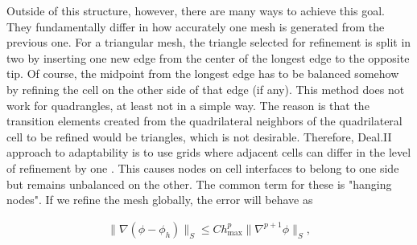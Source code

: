 \documentclass[]{pracamgr}
\begin{document}
        Outside of this structure, however, there are many ways to achieve this goal. They fundamentally differ in how accurately one mesh is generated from the previous one. For a triangular mesh, the triangle selected for refinement is split in two by inserting one new edge from the center of the longest edge to the opposite tip. Of course, the midpoint from the longest edge has to be balanced somehow by refining the cell on the other side of that edge (if any). This method does not work for quadrangles, at least not in a simple way. The reason is that the transition elements created from the quadrilateral neighbors of the quadrilateral cell to be refined would be triangles, which is not desirable. Therefore, Deal.II approach to adaptability is to use grids where adjacent cells can differ in the level of refinement by one \cite{adaptivemeshdealii}. This causes nodes on cell interfaces to belong to one side but remains unbalanced on the other. The common term for these is "hanging nodes". If we refine the mesh globally, the error will behave as

        \begin{align*}
          \|\nabla(\phi-\phi_h)\|_{S} \le C h_\text{max}^p \| \nabla^{p+1} \phi \|_{S},
        \end{align*}
\end{document}
